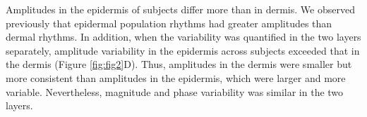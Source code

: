 Amplitudes in the epidermis of subjects differ more than in dermis. We observed previously that epidermal population rhythms had greater amplitudes than dermal rhythms. In addition, when the variability was quantified in the two layers separately, amplitude variability in the epidermis across subjects exceeded that in the dermis (Figure \ref{fig:fig2}D). Thus, amplitudes in the dermis were smaller but more consistent than amplitudes in the epidermis, which were larger and more variable. Nevertheless, magnitude and phase variability was similar in the two layers. 



